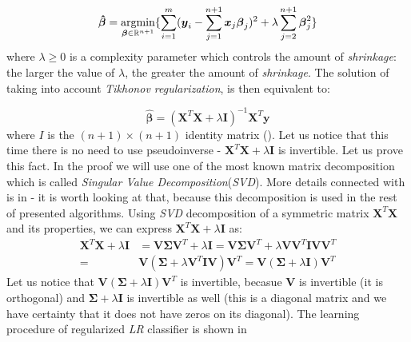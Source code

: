 \begin{equation}\label{eq:LR6}
    \boldsymbol{\hat{\beta}} = \operatorname*{argmin}_{\boldsymbol{\beta} \in \mathbb{R}^{n+1}}\{\sum\limits_{i=1}^{m}(\boldsymbol{y}_{i}-\sum\limits_{j=1}^{n+1}\boldsymbol{x}_j\boldsymbol{\beta}_j)^2+\lambda\sum\limits_{j=2}^{n+1}\boldsymbol{\beta}_j^2\}
\end{equation}
where $\lambda \geq 0$ is a complexity parameter which controls the amount of \textit{shrinkage}: the larger the value of $\lambda$, the greater the amount of \textit{shrinkage}.  The solution of  taking into account \textit{Tikhonov regularization}, is then equivalent to:

\begin{equation}\label{eq:LR7}
    \boldsymbol{\hat{\beta}} = (\boldsymbol{X}^T\boldsymbol{X}+\lambda\boldsymbol{I})^{-1}\boldsymbol{X}^T\boldsymbol{y}
\end{equation}
where $I$ is the $(n+1)\times(n+1)$ identity matrix (\cite{Trevor}). 
Let us notice that this time there is no need to use pseudoinverse - $\boldsymbol{X}^T\boldsymbol{X}+\lambda\boldsymbol{I}$ is invertible. Let us prove this fact. In the proof we will use one of the most known matrix decomposition which is called \textit{Singular Value Decomposition}(\textit{SVD}). More details connected with  is in  - it is worth looking at that, because this decomposition is used in the rest of presented algorithms. Using \textit{SVD} decomposition of a symmetric matrix $\boldsymbol{X}^T\boldsymbol{X}$ and its properties, we can express $\boldsymbol{X}^T\boldsymbol{X}+\lambda\boldsymbol{I}$ as: 
\begin{equation}\label{eq:inv_proof}
\begin{split}
    \boldsymbol{X}^T\boldsymbol{X} + \lambda\boldsymbol{I}&=\boldsymbol{V}\boldsymbol{\Sigma}\boldsymbol{V}^T + \lambda\boldsymbol{I} = \boldsymbol{V}\boldsymbol{\Sigma}\boldsymbol{V}^T + \lambda\boldsymbol{V}\boldsymbol{V}^T\boldsymbol{I}\boldsymbol{V}\boldsymbol{V}^T \\ 
    = &\boldsymbol{V}(\boldsymbol{\Sigma} + \lambda\boldsymbol{V}^T\boldsymbol{I}\boldsymbol{V})\boldsymbol{V}^T = \boldsymbol{V}(\boldsymbol{\Sigma} + \lambda\boldsymbol{I})\boldsymbol{V}^T 
\end{split}
\end{equation}
Let us notice that $\boldsymbol{V}(\boldsymbol{\Sigma} + \lambda\boldsymbol{I})\boldsymbol{V}^T$ is invertible, becasue $\boldsymbol{V}$ is invertible (it is orthogonal) and $\boldsymbol{\Sigma} +\lambda\boldsymbol{I}$ is invertible as well (this is a diagonal matrix and we have certainty that it does not have zeros on its diagonal). The learning procedure of regularized \textit{LR} classifier is shown in 

